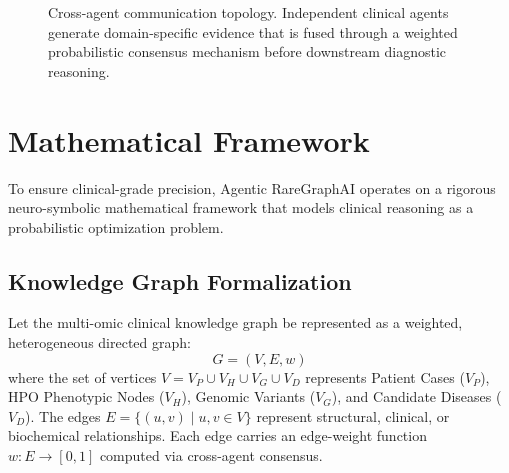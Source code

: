 \documentclass[conference]{IEEEtran}
\begin{document}
\begin{figure}[!t]
\centering
{}
\caption{Cross-agent communication topology. Independent clinical agents generate domain-specific evidence that is fused through a weighted probabilistic consensus mechanism before downstream diagnostic reasoning.}
\label{fig_consensus_topology}
\end{figure}

\section{Mathematical Framework}
To ensure clinical-grade precision, Agentic RareGraphAI operates on a rigorous neuro-symbolic mathematical framework that models clinical reasoning as a probabilistic optimization problem.

\subsection{Knowledge Graph Formalization}
Let the multi-omic clinical knowledge graph be represented as a weighted, heterogeneous directed graph:
\begin{equation}
G = (V, E, w)
\end{equation}
where the set of vertices $V = V_P \cup V_H \cup V_G \cup V_D$ represents Patient Cases ($V_P$), HPO Phenotypic Nodes ($V_H$), Genomic Variants ($V_G$), and Candidate Diseases ($V_D$). The edges $E = \{(u, v) \mid u, v \in V\}$ represent structural, clinical, or biochemical relationships. Each edge carries an edge-weight function $w : E \rightarrow [0, 1]$ computed via cross-agent consensus.
\end{document}

